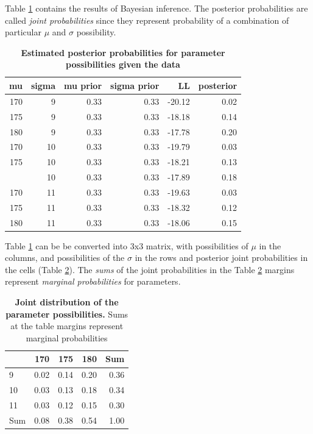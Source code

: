 \documentclass[
]{book}
\begin{document}
Table \ref{tab:bayes-height-grid-posterior} contains the results of Bayesian inference. The posterior probabilities are called \emph{joint probabilities} since they represent probability of a combination of particular \(\mu\) and \(\sigma\) possibility.



\begin{table}

\caption{\label{tab:bayes-height-grid-posterior}\textbf{Estimated posterior probabilities for parameter possibilities given the data}}
\centering
\begin{tabular}[t]{rrrrrr}
\toprule
mu & sigma & mu prior & sigma prior & LL & posterior\\
\midrule
170 & 9 & 0.33 & 0.33 & -20.12 & 0.02\\
175 & 9 & 0.33 & 0.33 & -18.18 & 0.14\\
180 & 9 & 0.33 & 0.33 & -17.78 & 0.20\\
170 & 10 & 0.33 & 0.33 & -19.79 & 0.03\\
175 & 10 & 0.33 & 0.33 & -18.21 & 0.13\\
\addlinespace
180 & 10 & 0.33 & 0.33 & -17.89 & 0.18\\
170 & 11 & 0.33 & 0.33 & -19.63 & 0.03\\
175 & 11 & 0.33 & 0.33 & -18.32 & 0.12\\
180 & 11 & 0.33 & 0.33 & -18.06 & 0.15\\
\bottomrule
\end{tabular}
\end{table}

Table \ref{tab:bayes-height-grid-posterior} can be be converted into 3x3 matrix, with possibilities of \(\mu\) in the columns, and possibilities of the \(\sigma\) in the rows and posterior joint probabilities in the cells (Table \ref{tab:bayes-height-grid-posterior-matrix}). The \emph{sums} of the joint probabilities in the Table \ref{tab:bayes-height-grid-posterior-matrix} margins represent \emph{marginal probabilities} for parameters.



\begin{table}

\caption{\label{tab:bayes-height-grid-posterior-matrix}\textbf{Joint distribution of the parameter possibilities. }Sums at the table margins represent marginal probabilities}
\centering
\begin{tabular}[t]{lrrrr}
\toprule
  & 170 & 175 & 180 & Sum\\
\midrule
9 & 0.02 & 0.14 & 0.20 & 0.36\\
10 & 0.03 & 0.13 & 0.18 & 0.34\\
11 & 0.03 & 0.12 & 0.15 & 0.30\\
Sum & 0.08 & 0.38 & 0.54 & 1.00\\
\bottomrule
\end{tabular}
\end{table}
\end{document}
